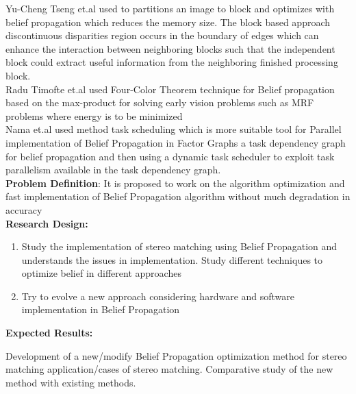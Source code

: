 Yu-Cheng Tseng et.al\cite{Y.C.} used to partitions an image to block and optimizes with belief propagation which reduces the memory size. The block based approach discontinuous disparities region occurs in the boundary of edges which can enhance the interaction between neighboring blocks such that the independent block could extract useful information from the neighboring finished processing block.\\
Radu Timofte et.al\cite{Radu} used Four-Color Theorem  technique for Belief propagation based on the max-product for solving early vision problems such as MRF problems where energy is to be minimized\\
Nama et.al \cite{Nam Ma} used method task scheduling which is more suitable tool for Parallel implementation of Belief Propagation in Factor Graphs a task dependency graph for belief propagation and then using a dynamic task scheduler to exploit task parallelism available in the task dependency graph.\\

\textbf{Problem Definition}:
It is proposed to work on the algorithm optimization and fast implementation of Belief Propagation algorithm without much degradation in accuracy\\


\textbf{Research Design:}
\begin{enumerate}
\item Study the implementation of stereo matching using Belief Propagation and understands the issues in implementation. Study different techniques to optimize belief in different approaches

\item Try to evolve a new approach considering hardware and software implementation in Belief Propagation
\end{enumerate}

\textbf{Expected Results:}

Development of a new/modify Belief Propagation optimization method for stereo matching application/cases of stereo matching. Comparative study of the new method with existing methods.



